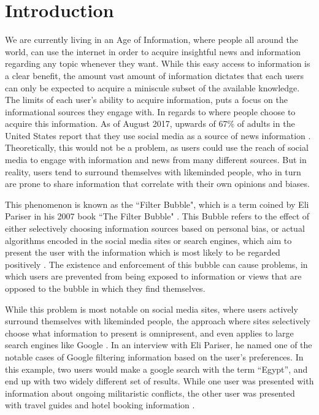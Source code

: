 \chapter{Introduction}
We are currently living in an Age of Information, where people all around the
world, can use the internet in order to acquire insightful news and information
regarding any topic whenever they want. While this easy access to information is
a clear benefit, the amount vast amount of information dictates that each
users can only be expected to acquire a miniscule subset of the available
knowledge.\\
The limits of each user's ability to acquire information, puts a focus on the
informational sources they engage with. In regards to where people choose to
acquire this information. As of August 2017, upwards of 67\% of adults in the
United States report that they use social media as a source of news
information \citep{journalism2017}. Theoretically, this would not be a problem,
as users could use the reach of social media to engage with information and
news from many different sources. But in reality, users tend to surround
themselves with likeminded people, who in turn are prone to share information
that correlate with their own opinions and biases.\nl

This phenomenon is known as the ``Filter Bubble", which is a term coined by Eli
Pariser in his 2007 book ``The Filter Bubble" \citep{pariser2011filter}. This
Bubble refers to the effect of either selectively choosing information sources
based on personal bias, or actual algorithms encoded in the social media sites
or search engines, which aim to present the user with the information which is
most likely to be regarded positively \Source. The existence and enforcement of this
bubble can cause problems, in which users are prevented from being exposed to
information or views that are opposed to the bubble in which they find
themselves.\nl

While this problem is most notable on social media sites, where users actively
surround themselves with likeminded people, the approach where sites selectively
choose what information to present is omnipresent, and even applies to large
search engines like Google \citep{filterBubbleDef}. In an interview with Eli
Pariser, he named one of the notable cases of Google filtering information based
on the user's preferences. In this example, two users would make a google search
with the term ``Egypt'', and end up with two widely different set of results.
While one user was presented with information about ongoing militaristic
conflicts, the other user was presented with travel guides and hotel booking
information \citep{nusSduSearch}.
